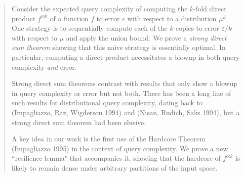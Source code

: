 

\begin{abstract} 
Consider the expected query complexity of computing the $k$-fold direct product $f^{\otimes k}$ of a function $f$ to error $\varepsilon$ with respect to a distribution $\mu^k$. One strategy is to sequentially compute each of the $k$ copies to error $\varepsilon/k$ with respect to $\mu$ and apply the union bound. We prove a {\sl strong direct sum theorem} showing that this naive strategy is essentially optimal. In particular, computing a direct product necessitates a blowup in both query complexity {\sl and} error. 

Strong direct sum theorems contrast with results that only show a blowup in query complexity or error but not both. There has been a long line of such results for distributional query complexity, dating back to (Impagliazzo, Raz, Wigderson 1994) and (Nisan, Rudich, Saks 1994), but a strong direct sum theorem had been elusive.


A key idea in our work is the first use of the Hardcore Theorem (Impagliazzo 1995) in the context of query complexity. We prove a new ``resilience lemma" that accompanies it, showing that the hardcore of $f^{\otimes k}$ is likely to remain dense under arbitrary partitions of the input space. 


\end{abstract} 

\thispagestyle{empty}

\newpage 
 \setcounter{tocdepth}{2}
\tableofcontents
\thispagestyle{empty}

\newpage 

